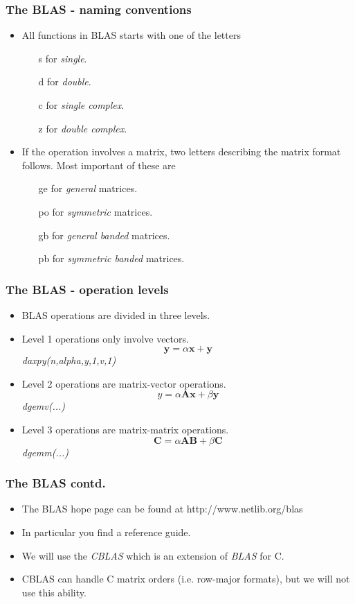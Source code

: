 \documentclass[ignorenonframetext]{beamer}
\begin{document}
\begin{frame}\frametitle{The BLAS - naming conventions}
\begin{itemize}
  \item All functions in BLAS starts with one of the letters
    \begin{itemize}
      \item[s] for \emph{single}.
      \item[d] for \emph{double}.
      \item[c] for \emph{single complex}.
      \item[z] for \emph{double complex}.
    \end{itemize}
  \item If the operation involves a matrix, two letters describing the matrix 
    format follows. Most important of these are
      \begin{itemize}
        \item[ge] for \emph{general} matrices.
        \item[po] for \emph{symmetric} matrices.
        \item[gb] for \emph{general banded} matrices.
        \item[pb] for \emph{symmetric banded} matrices.
      \end{itemize}
\end{itemize}
\end{frame}

\begin{frame}\frametitle{The BLAS - operation levels}
\begin{itemize}
  \item BLAS operations are divided in three levels.
  \item Level 1 operations only involve vectors.
    \[
      \mathbf{y} = \alpha \mathbf{x} + \mathbf{y}
    \]
    \emph{daxpy(n,alpha,y,1,v,1)}
  \item Level 2 operations are matrix-vector operations.
    \[
      y = \alpha\mathbf{A}\mathbf{x} + \beta\mathbf{y}
    \]
    \emph{dgemv(...)}
  \item Level 3 operations are matrix-matrix operations.
    \[
      \mathbf{C} = \alpha\mathbf{A}\mathbf{B}+\beta\mathbf{C}
    \]
    \emph{dgemm(...)}
\end{itemize}
\end{frame}

\begin{frame}\frametitle{The BLAS contd.}
\begin{itemize}
  \item The BLAS hope page can be found at http://www.netlib.org/blas
  \item In particular you find a reference guide.
  \item We will use the \emph{CBLAS} which is an extension of \emph{BLAS} for
      C.
  \item CBLAS can handle C matrix orders (i.e. row-major formats), but we will
      not use this ability.
\end{itemize}
\end{frame}
\end{document}
